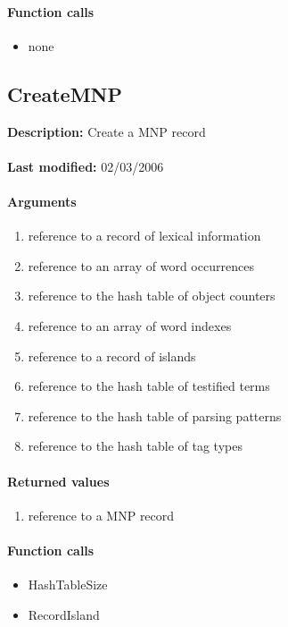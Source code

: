 \paragraph{Function calls}
\begin{itemize}
\item none
\end{itemize}

\subsection{CreateMNP}
\textbf{Description:} Create a MNP record\\
\\\textbf{Last modified:} 02/03/2006

\paragraph{Arguments}
\begin{enumerate}
\item reference to a record of lexical information
\item reference to an array of word occurrences
\item reference to the hash table of object counters
\item reference to an array of word indexes
\item reference to a record of islands
\item reference to the hash table of testified terms
\item reference to the hash table of parsing patterns
\item reference to the hash table of tag types
\end{enumerate}

\paragraph{Returned values}
\begin{enumerate}
\item reference to a MNP record
\end{enumerate}

\paragraph{Function calls}
\begin{itemize}
\item HashTableSize
\item RecordIsland
\end{itemize}

